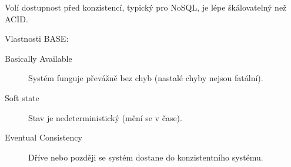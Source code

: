 Volí dostupnost před konzistencí, typický pro NoSQL, je lépe škálovatelný než ACID.

Vlastnosti BASE:

\begin{description}
    \item[Basically Available] Systém funguje převážně bez chyb (nastalé chyby nejsou fatální).
    \item[Soft state] Stav je nedeterministický (mění se v čase).
    \item[Eventual Consistency] Dříve nebo později se systém dostane do konzistentního systému.  
\end{description}
